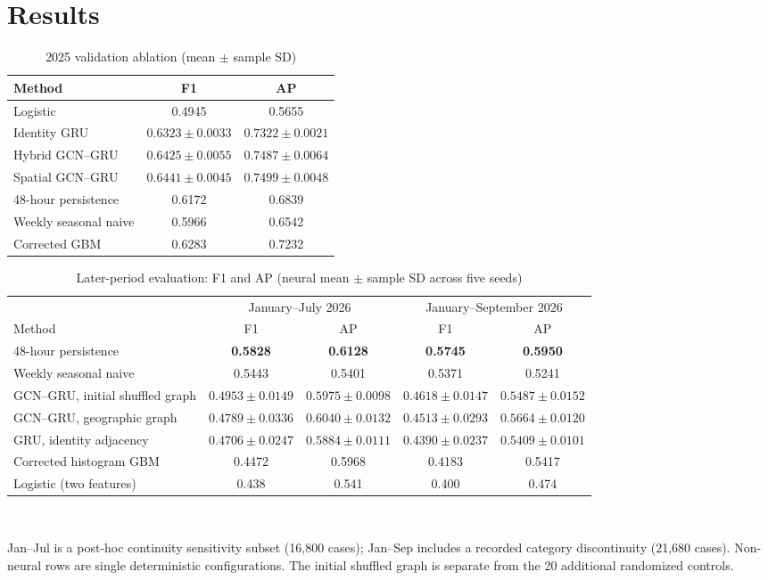 \documentclass[conference]{IEEEtran}
\begin{document}
\section{Results}
\begin{table}[t]
\caption{2025 validation ablation (mean $\pm$ sample SD)}
\label{tab:val}\centering\small
\begin{tabular}{lcc}\toprule
Method & F1 & AP\\\midrule
Logistic & 0.4945 & 0.5655\\
Identity GRU & $0.6323\pm0.0033$ & $0.7322\pm0.0021$\\
Hybrid GCN--GRU & $0.6425\pm0.0055$ & $0.7487\pm0.0064$\\
Spatial GCN--GRU & $0.6441\pm0.0045$ & $0.7499\pm0.0048$\\
48-hour persistence & 0.6172 & 0.6839\\
Weekly seasonal naive & 0.5966 & 0.6542\\
Corrected GBM & 0.6283 & 0.7232\\\bottomrule
\end{tabular}
\end{table}
\begin{table}[t]
\caption{Later-period evaluation: F1 and AP (neural mean $\pm$ sample SD across five seeds)}
\label{tab:main}\centering\small
\begin{tabular}{lcccc}\toprule
& \multicolumn{2}{c}{January--July 2026} & \multicolumn{2}{c}{January--September 2026}\\
\cmidrule(lr){2-3}\cmidrule(lr){4-5}
Method & F1 & AP & F1 & AP\\\midrule
48-hour persistence & \textbf{0.5828} & \textbf{0.6128} & \textbf{0.5745} & \textbf{0.5950}\\
Weekly seasonal naive & 0.5443 & 0.5401 & 0.5371 & 0.5241\\
GCN--GRU, initial shuffled graph & $0.4953\pm0.0149$ & $0.5975\pm0.0098$ & $0.4618\pm0.0147$ & $0.5487\pm0.0152$\\
GCN--GRU, geographic graph & $0.4789\pm0.0336$ & $0.6040\pm0.0132$ & $0.4513\pm0.0293$ & $0.5664\pm0.0120$\\
GRU, identity adjacency & $0.4706\pm0.0247$ & $0.5884\pm0.0111$ & $0.4390\pm0.0237$ & $0.5409\pm0.0101$\\
Corrected histogram GBM & 0.4472 & 0.5968 & 0.4183 & 0.5417\\
Logistic (two features) & 0.438 & 0.541 & 0.400 & 0.474\\\bottomrule
\end{tabular}\\[2pt]
\parbox{.98\textwidth}{\footnotesize Jan--Jul is a post-hoc continuity sensitivity subset (16,800 cases); Jan--Sep includes a recorded category discontinuity (21,680 cases). Non-neural rows are single deterministic configurations. The initial shuffled graph is separate from the 20 additional randomized controls.}
\end{table}
\end{document}
